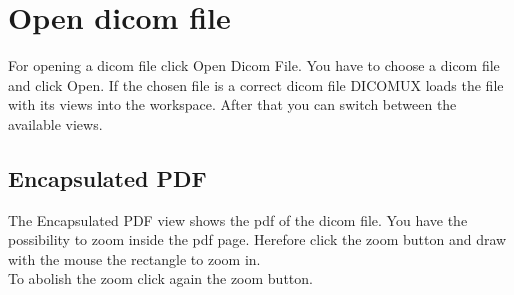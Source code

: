 	\begin{minipage}{\textwidth} 
	\centering
	\label{fig:bild}
	\end{minipage}

\section{Open dicom file}
For opening a dicom file click Open Dicom File. You have to choose a dicom file
and click Open. If the chosen file is a correct dicom file DICOMUX loads the
file with its views into the workspace. After that you can switch between the
available views.\\

\begin{minipage}{\textwidth} 
\centering
{}
\label{fig:bild}
\end{minipage}

	\subsection{Encapsulated PDF}
	The Encapsulated PDF view shows the pdf of the dicom file. You have the
	possibility to zoom inside the pdf page. Herefore click the zoom button and draw with the
	mouse the rectangle to zoom in.\\
	To abolish the zoom click again the zoom button. \\
	
